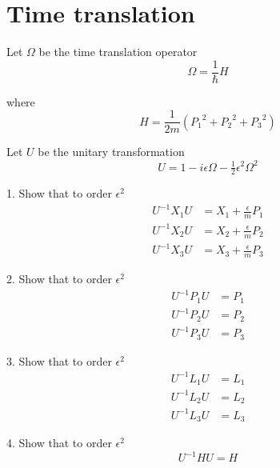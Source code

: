 

\section*{Time translation}

Let $\Omega$ be the time translation operator
\begin{equation*}
\Omega=\frac{1}{\hbar}H
\end{equation*}

where
\begin{equation*}
H=\frac{1}{2m}\left({P_1}^2+{P_2}^2+{P_3}^2\right)
\end{equation*}

Let $U$ be the unitary transformation
\begin{equation*}
U=1-i\epsilon\Omega-\tfrac{1}{2}\epsilon^2\Omega^2
\end{equation*}

1. Show that to order $\epsilon^2$
\begin{align*}
U^{-1}X_1U&=X_1+\frac{\epsilon}{m}P_1
\\
U^{-1}X_2U&=X_2+\frac{\epsilon}{m}P_2
\\
U^{-1}X_3U&=X_3+\frac{\epsilon}{m}P_3
\end{align*}

2. Show that to order $\epsilon^2$
\begin{align*}
U^{-1}P_1U&=P_1
\\
U^{-1}P_2U&=P_2
\\
U^{-1}P_3U&=P_3
\end{align*}

3. Show that to order $\epsilon^2$
\begin{align*}
U^{-1}L_1U&=L_1
\\
U^{-1}L_2U&=L_2
\\
U^{-1}L_3U&=L_3
\end{align*}

4. Show that to order $\epsilon^2$
\begin{equation*}
U^{-1}HU=H
\end{equation*}


